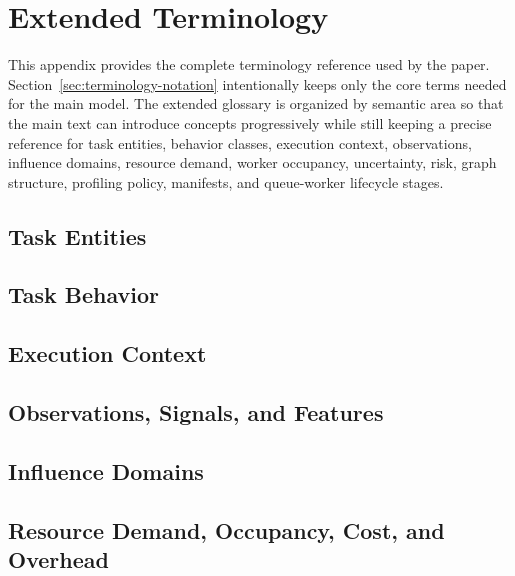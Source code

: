 \section{Extended Terminology}
\label{app:extended-terminology}

This appendix provides the complete terminology reference used by the paper.
Section~\ref{sec:terminology-notation} intentionally keeps only the core terms
needed for the main model. The extended glossary is organized by semantic area
so that the main text can introduce concepts progressively while still keeping a
precise reference for task entities, behavior classes, execution context,
observations, influence domains, resource demand, worker occupancy,
uncertainty, risk, graph structure, profiling policy, manifests, and
queue-worker lifecycle stages.

\subsection{Task Entities}
\label{app:terms-task-entities}


\subsection{Task Behavior}
\label{app:terms-task-behavior}


\subsection{Execution Context}
\label{app:terms-execution-context}


\subsection{Observations, Signals, and Features}
\label{app:terms-observations-signals-features}


\subsection{Influence Domains}
\label{app:terms-influence-domains}


\subsection{Resource Demand, Occupancy, Cost, and Overhead}
\label{app:terms-resource-demand-occupancy-cost}



